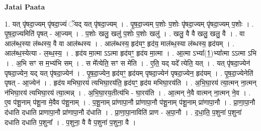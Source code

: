 \documentclass[17pt]{extarticle}
\begin{document}
\textbf{Jatai Paata} \newline

1. यत् पृ॑षदा॒ज्यम् पृ॑षदा॒ज्यं ॅयद् यत् पृ॑षदा॒ज्यम् । . पृ॒ष॒दा॒ज्यम् प॒शोः प॒शोः पृ॑षदा॒ज्यम् पृ॑षदा॒ज्यम् प॒शोः । . पृ॒ष॒दा॒ज्यमिति॑ पृषत् - आ॒ज्यम् । . प॒शोः खलु॒ खलु॑ प॒शोः प॒शोः खलु॑ । . खलु॒ वै वै खलु॒ खलु॒ वै । . वा आल॑ब्ध॒स्या ल॑ब्धस्य॒ वै वा आल॑ब्धस्य । . आल॑ब्धस्य॒ हृद॑यꣳ॒॒ हृद॑य॒ माल॑ब्ध॒स्या ल॑ब्धस्य॒ हृद॑यम् । . आल॑ब्ध॒स्येत्या - ल॒ब्ध॒स्य॒ । . हृद॑य मा॒त्मा ऽऽत्मा हृद॑यꣳ॒॒ हृद॑य मा॒त्मा । . आ॒त्मा ऽभ्या᳚(1॒)भ्या᳚त्मा ऽऽत्मा ऽभि । . अ॒भि सꣳ स म॒भ्य॑भि सम् । . स मे᳚त्येति॒ सꣳ स मे॑ति । . ए॒ति॒ यद् यदे᳚ त्येति॒ यत् । . यत् पृ॑षदा॒ज्येन॑ पृषदा॒ज्येन॒ यद् यत् पृ॑षदा॒ज्येन॑ । . पृ॒ष॒दा॒ज्येन॒ हृद॑यꣳ॒॒ हृद॑यम् पृषदा॒ज्येन॑ पृषदा॒ज्येन॒ हृद॑यम् । . पृ॒ष॒दा॒ज्येनेति॑ पृषत् - आ॒ज्येन॑ । . हृद॑य मभिघा॒रय॑ त्यभिघा॒रय॑ति॒ हृद॑यꣳ॒॒ हृद॑य मभिघा॒रय॑ति । . अ॒भि॒घा॒रय॑ त्या॒त्मन् ना॒त्मन् न॑भिघा॒रय॑ त्यभिघा॒रय॑ त्या॒त्मन्न् । . अ॒भि॒घा॒रय॒तीत्य॑भि - घा॒रय॑ति । . आ॒त्मन् ने॒वै वात्मन् ना॒त्मन् ने॒व । . ए॒व प॑शू॒नाम् प॑शू॒ना मे॒वैव प॑शू॒नाम् । . प॒शू॒नाम् प्रा॑णापा॒नौ प्रा॑णापा॒नौ प॑शू॒नाम् प॑शू॒नाम् प्रा॑णापा॒नौ । . प्रा॒णा॒पा॒नौ द॑धाति दधाति प्राणापा॒नौ प्रा॑णापा॒नौ द॑धाति । . प्रा॒णा॒पा॒नाविति॑ प्राण - अ॒पा॒नौ । . द॒धा॒ति॒ प॒शुना॑ प॒शुना॑ दधाति दधाति प॒शुना᳚ । . प॒शुना॒ वै वै प॒शुना॑ प॒शुना॒ वै । \newline
\end{document}
